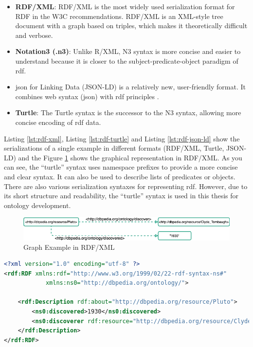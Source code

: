                 \begin{itemize}
                    \item \textbf{RDF/XML}: RDF/XML is the most widely used serialization format for RDF in the W3C recommendations. RDF/XML is an XML-style tree document with a graph based on triples, which makes it theoretically difficult and verbose. 
                    \item \textbf{Notation3 (.n3)}: Unlike R/XML, N3 syntax is more concise and easier to understand because it is closer to the subject-predicate-object paradigm of \acrshort{rdf}. 
                    \item \acrfull{json} for Linking Data (JSON-LD) is a relatively new, user-friendly format. It combines web syntax (\acrshort{json}) with \acrshort{rdf} principles \cite{grlicky2005overview}. 
                    \item \textbf{Turtle}: The Turtle syntax is the successor to the N3 syntax, allowing more concise encoding of \acrshort{rdf} data.
                \end{itemize}

                Listing \ref{lst:rdf-xml}, Listing \ref{lst:rdf-turtle} and Listing \ref{lst:rdf-json-ld} show the serializations of a single example in different formats (RDF/XML, Turtle, JSON-LD) and the Figure \ref{fig:rdf-xml-example} shows the graphical representation in RDF/XML. As you can see, the “turtle” syntax uses namespace prefixes to provide a more concise and clear syntax. It can also be used to describe lists of predicates or objects. There are also various serialization syntaxes for representing \acrshort{rdf}. However, due to its short structure and readability, the “turtle” syntax is used in this thesis for ontology development.\\
            
                \begin{figure}[H]
                    \centering
                    \includegraphics[scale=0.6]{images/Foundation-RDF XML.drawio.png}
                    \caption{\label{fig:rdf-xml-example}  Graph Example in RDF/XML}
                \end{figure}

                \begin{lstlisting}[language=XML, caption=Example of RDF Serialization in RDF/XML, label={lst:rdf-xml}]
<?xml version="1.0" encoding="utf-8" ?>
<rdf:RDF xmlns:rdf="http://www.w3.org/1999/02/22-rdf-syntax-ns#"
            xmlns:ns0="http://dbpedia.org/ontology/">

    <rdf:Description rdf:about="http://dbpedia.org/resource/Pluto">
        <ns0:discovered>1930</ns0:discovered>
        <ns0:discoverer rdf:resource="http://dbpedia.org/resource/Clyde_Tombaugh"/>
    </rdf:Description>
</rdf:RDF>
                \end{lstlisting}

